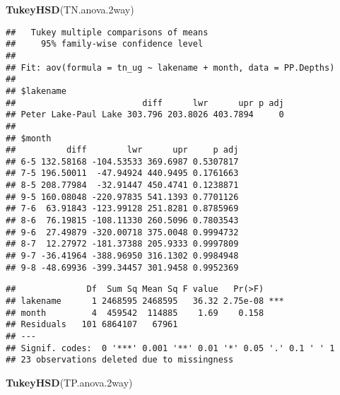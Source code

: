 \documentclass[]{article}
\newenvironment{Shaded}{\begin{snugshade}}{\end{snugshade}}
\newcommand{\KeywordTok}[1]{\textcolor[rgb]{0.13,0.29,0.53}{\textbf{#1}}}
\newcommand{\DataTypeTok}[1]{\textcolor[rgb]{0.13,0.29,0.53}{#1}}
\newcommand{\StringTok}[1]{\textcolor[rgb]{0.31,0.60,0.02}{#1}}
\newcommand{\CommentTok}[1]{\textcolor[rgb]{0.56,0.35,0.01}{\textit{#1}}}
\newcommand{\OperatorTok}[1]{\textcolor[rgb]{0.81,0.36,0.00}{\textbf{#1}}}
\newcommand{\NormalTok}[1]{#1}
\begin{document}
\begin{Shaded}
\begin{Highlighting}[]
\KeywordTok{TukeyHSD}\NormalTok{(TN.anova.2way)}
\end{Highlighting}
\end{Shaded}

\begin{verbatim}
##   Tukey multiple comparisons of means
##     95% family-wise confidence level
## 
## Fit: aov(formula = tn_ug ~ lakename + month, data = PP.Depths)
## 
## $lakename
##                         diff      lwr      upr p adj
## Peter Lake-Paul Lake 303.796 203.8026 403.7894     0
## 
## $month
##          diff        lwr      upr     p adj
## 6-5 132.58168 -104.53533 369.6987 0.5307817
## 7-5 196.50011  -47.94924 440.9495 0.1761663
## 8-5 208.77984  -32.91447 450.4741 0.1238871
## 9-5 160.08048 -220.97835 541.1393 0.7701126
## 7-6  63.91843 -123.99128 251.8281 0.8785969
## 8-6  76.19815 -108.11330 260.5096 0.7803543
## 9-6  27.49879 -320.00718 375.0048 0.9994732
## 8-7  12.27972 -181.37388 205.9333 0.9997809
## 9-7 -36.41964 -388.96950 316.1302 0.9984948
## 9-8 -48.69936 -399.34457 301.9458 0.9952369
\end{verbatim}

\begin{Shaded}
\end{Shaded}

\begin{verbatim}
##              Df  Sum Sq Mean Sq F value   Pr(>F)    
## lakename      1 2468595 2468595   36.32 2.75e-08 ***
## month         4  459542  114885    1.69    0.158    
## Residuals   101 6864107   67961                     
## ---
## Signif. codes:  0 '***' 0.001 '**' 0.01 '*' 0.05 '.' 0.1 ' ' 1
## 23 observations deleted due to missingness
\end{verbatim}

\begin{Shaded}
\begin{Highlighting}[]
\KeywordTok{TukeyHSD}\NormalTok{(TP.anova.2way)}
\end{Highlighting}
\end{Shaded}
\end{document}
